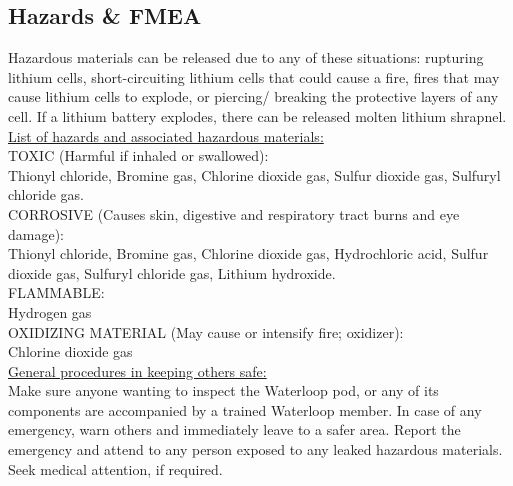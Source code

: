 \documentclass[hidelinks, twoside]{report}
\begin{document}
    \begin{appendices}
        \makeatletter
        \makeatother
        
        \chapter{Hazards \& FMEA}

Hazardous materials can be released due to any of these situations: rupturing lithium cells, short-circuiting lithium cells that could cause a fire, fires that may cause lithium cells to explode, or piercing/ breaking the protective layers of any cell. If a lithium battery explodes, there can be released molten lithium shrapnel.\\

\noindent \underline{List of hazards and associated hazardous materials:}\\

\noindent TOXIC (Harmful if inhaled or swallowed):\\
\noindent Thionyl chloride, Bromine gas, Chlorine dioxide gas, Sulfur dioxide gas, Sulfuryl chloride gas.\\

\noindent CORROSIVE (Causes skin, digestive and respiratory tract burns and eye damage):\\
\noindent Thionyl chloride, Bromine gas, Chlorine dioxide gas, Hydrochloric acid, Sulfur dioxide gas, Sulfuryl chloride gas, Lithium hydroxide.\\

\noindent FLAMMABLE:\\
\noindent Hydrogen gas\\

\noindent OXIDIZING MATERIAL (May cause or 
intensify fire; oxidizer):\\
\noindent Chlorine dioxide gas\\

\noindent \underline{General procedures in keeping others safe:}\\
    
\noindent Make sure anyone wanting to inspect the Waterloop pod, or any of its components are accompanied by a trained Waterloop member. In case of any emergency, warn others and immediately leave to a safer area. Report the emergency and attend to any person exposed to any leaked hazardous materials. Seek medical attention, if required.\\


\end{appendices}
\end{document}

